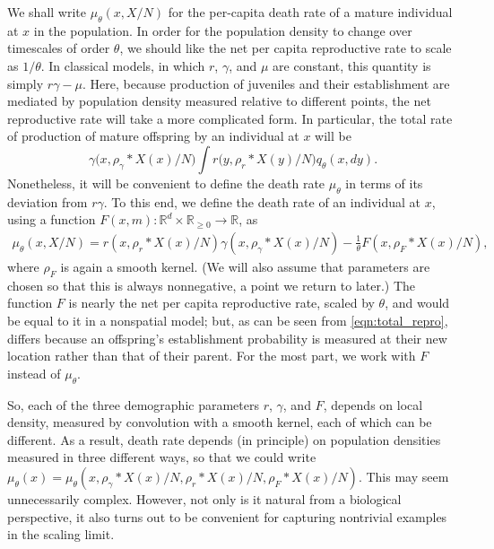 \documentclass[EJP]{ejpecp} %
\newcommand{\IR}{\mathbb R}
\newcommand{\kernel}{\rho}  %
\newcommand{\smooth}[1]{\kernel_{#1} \! * \!}  %
\begin{document}
We shall write $\mu_\theta(x, X/N)$ for the per-capita death rate of a mature individual
at $x$ in the population.
In order for the 
population density to change over timescales of order $\theta$, we should like the net 
per capita reproductive rate 
to scale as $1/\theta$. 
In classical models, in which $r$, $\gamma$, and $\mu$ are constant, 
this quantity is simply $r\gamma -\mu$. 
Here, because production of juveniles and their establishment are
mediated by population density measured relative to different points, 
the net reproductive rate will take a more complicated form. 
In particular, the total rate of production of mature offspring by an individual at $x$ will be
\begin{equation} \label{eqn:total_repro}
	\gamma\big(x,\smooth{\gamma}X(x)/N\big)\int r\big(y, \smooth{r}X(y)/N\big)q_{\theta}(x,dy).
\end{equation}
Nonetheless, it will be convenient to define the death rate $\mu_\theta$ in terms of 
its deviation from $r\gamma$. 
To this end, we define
the death rate of an individual at $x$,  
using a function $F(x, m) : \IR^d \times \IR_{\ge 0} \to \IR$,
as
\begin{align} \label{eqn:mu_defn}
    \mu_\theta(x, X/N)
    =
        r(x, \smooth{r} X(x) / N) \gamma(x, \smooth{\gamma} X(x) / N)
        - \frac{1}{\theta} F(x, \smooth{F} X(x) / N)
    ,
\end{align}
where $\rho_F$ is again a smooth kernel. 
(We will also assume that parameters are chosen so that this is always nonnegative,
a point we return to later.)
The function $F$ is nearly
the net per capita reproductive rate, scaled by $\theta$,
and would be equal to it in a nonspatial model;
but, as can be seen from \eqref{eqn:total_repro},
differs because an offspring's establishment probability is measured at their new location
rather than that of their parent.
For the most part, we work with $F$ instead of $\mu_\theta$.

So, each of the three demographic parameters $r$, $\gamma$, and $F$,
depends on local density, measured by convolution with a smooth kernel,
each of which can be different.
As a result, death rate depends (in principle) on population densities measured in 
three different ways, 
so that we could write 
$\mu_\theta(x) = \mu_\theta(x, \smooth{\gamma} X(x) / N, \smooth{r} X(x) / N, \smooth{F} X(x) / N)$.
This may seem unnecessarily complex.
However, not only is it natural from a 
biological perspective, it also turns out to be convenient for
capturing nontrivial examples in the scaling limit.
\end{document}

